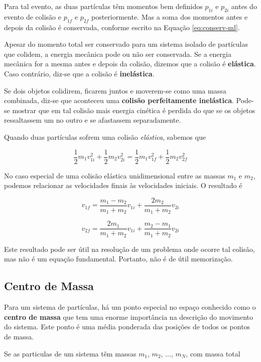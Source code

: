Para tal evento, as duas partículas têm momentos bem definidos $p_{1i}$ e $p_{2i}$ antes do evento de colisão e $p_{1f}$ e $p_{2f}$ posteriormente. Mas a soma dos momentos antes e depois da colisão é conservada, conforme escrito na Equação \ref{eq:conserv-ml}.

Apesar do momento total ser conservado para um sistema isolado de partículas que colidem, a energia mecânica pode ou não ser conservada. Se a energia mecânica for a mesma antes e depois da colisão, dizemos que a colisão é \textbf{elástica}. Caso contrário, diz-se que a colisão é \textbf{inelástica}.

Se dois objetos colidirem, ficarem juntos e moverem-se como uma massa combinada, diz-se que aconteceu uma \textbf{colisão perfeitamente inelástica}. Pode-se mostrar que em tal colisão mais energia cinética é perdida do que se os objetos ressaltassem um no outro e se afastassem separadamente.

Quando duas partículas sofrem uma colisão \emph{elástica}, sabemos que

$$
\frac{1}{2}m_1v_{1i}^2+\frac{1}{2}m_2v_{2i}^2=\frac{1}{2}m_1v_{1f}^2+\frac{1}{2}m_2v_{2f}^2
$$

No caso especial de uma colisão elástica unidimensional entre as massas $m_1$ e $m_2$, podemos relacionar as velocidades finais às velocidades iniciais. O resultado é

\begin{equation}
    v_{1f}=\frac{m_1-m_2}{m_1+m_2}v_{1i}+\frac{2m_2}{m_1+m_2}v_{2i}
\end{equation}

\begin{equation}
    v_{2f}=\frac{2m_1}{m_1+m_2}v_{1i}+\frac{m_2-m_1}{m_1+m_2}v_{2i}
\end{equation}

Este resultado pode ser útil na resolução de um problema onde ocorre tal colisão, mas não é um equação fundamental. Portanto, não é de útil memorização.

\subsection{Centro de Massa}
Para um sistema de partículas, há um ponto especial no espaço conhecido como o \textbf{centro de massa} que tem uma enorme importância na descrição do movimento do sistema. Este ponto é uma média ponderada das posições de todos os pontos de massa.

Se as particulas de um sistema têm massas $m_1$, $m_2$, ..., $m_N$, com massa total

